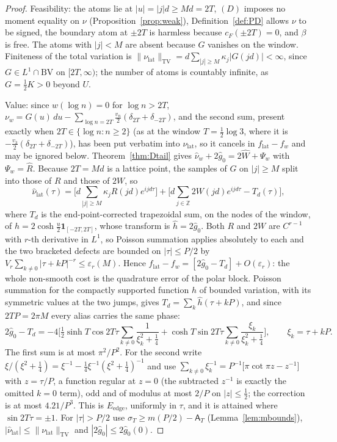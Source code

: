 \documentclass[11pt]{amsart}
\theoremstyle{definition}
\theoremstyle{remark}
\newcommand{\Z}{\mathbb Z}
\newcommand{\TV}{\operatorname{TV}}
\newcommand{\sT}{\sigma_T}
\newcommand{\gh}[1]{\widehat g_{#1}}
\newcommand{\nuh}{\widehat\nu}
\newcommand{\cF}{c_F}
\newcommand{\Aconst}{\mathsf A_T}
\begin{document}
\begin{proof}
Feasibility: the atoms lie at $|u|=|j|d\ge Md=2T$, $(D)$ imposes no moment equality on $\nu$
(Proposition~\ref{prop:weak}), Definition~\ref{def:PD} allows $\nu$ to be signed, the boundary atom
at $\pm2T$ is harmless because $\cF(\pm2T)=0$, and $\beta$ is free. The atoms with $|j|<M$ are absent
because $G$ vanishes on the window. Finiteness of the total variation is
$\|\nu_{\mathrm{lat}}\|_{\TV}=d\sum_{|j|\ge M}\kappa_j|G(jd)|<\infty$, since $G\in L^1\cap
\mathrm{BV}$ on $[2T,\infty)$; the number of atoms is countably infinite, as $G=\frac12K>0$ beyond
$U$.

Value: since $w(\log n)=0$ for $\log n>2T$, $\nu_w=G(u)\,du-\sum_{\log n=2T}\frac{v_n}2(\delta_{2T}+\delta_{-2T})$,
and the second sum, present exactly when $2T\in\{\log n:n\ge2\}$ (as at the window $T=\frac12\log3$,
where it is $-\frac{v_3}2(\delta_{2T}+\delta_{-2T})$), has been put verbatim into
$\nu_{\mathrm{lat}}$, so it cancels in $f_{\mathrm{lat}}-f_w$ and may be ignored below.
Theorem~\ref{thm:Dtail}
gives $\nuh_w+2\gh0=2\widehat W+\Psi_w$ with $\Psi_w=\widehat R$. Because $2T=Md$ is a lattice point,
the samples of $G$ on $|j|\ge M$ split into those of $R$ and those of $2W$, so
\[
\nuh_{\mathrm{lat}}(\tau)=\Big[d\sum_{|j|\ge M}\kappa_jR(jd)e^{ijd\tau}\Big]
+\Big[d\sum_{j\in\Z}2W(jd)e^{ijd\tau}-T_d(\tau)\Big],
\]
where $T_d$ is the end-point-corrected trapezoidal sum, on the nodes of the window, of
$h=2\cosh\frac u2\mathbf 1_{[-2T,2T]}$, whose transform is $\widehat h=2\gh0$. Both $R$ and $2W$ are
$C^{r-1}$ with $r$-th derivative in $L^1$, so Poisson summation applies absolutely to each and the
two bracketed defects are bounded on $|\tau|\le P/2$ by
$V_r\sum_{k\ne0}|\tau+kP|^{-r}\le\varepsilon_r(M)$. Hence
$f_{\mathrm{lat}}-f_w=[2\gh0-T_d]+O(\varepsilon_r)$: the whole non-smooth cost is the quadrature
error of the polar block. Poisson summation for the compactly supported function $h$ of bounded
variation, with its symmetric values at the two jumps, gives $T_d=\sum_k\widehat h(\tau+kP)$, and
since $2TP=2\pi M$ every alias carries the same phase:
\[
2\gh0-T_d=-4\Big[\tfrac12\sinh T\cos2T\tau\sum_{k\ne0}\frac1{\xi_k^2+\frac14}
+\cosh T\sin2T\tau\sum_{k\ne0}\frac{\xi_k}{\xi_k^2+\frac14}\Big],\qquad\xi_k=\tau+kP .
\]
The first sum is at most $\pi^2/P^2$. For the second write
$\xi/(\xi^2+\frac14)=\xi^{-1}-\frac14\xi^{-1}(\xi^2+\frac14)^{-1}$ and use
$\sum_{k\ne0}\xi_k^{-1}=P^{-1}\big[\pi\cot\pi z-z^{-1}\big]$ with $z=\tau/P$, a function
regular at $z=0$ (the subtracted $z^{-1}$ is exactly the omitted $k=0$ term), odd and of
modulus at most $2/P$ on $|z|\le\frac12$; the correction is at most $4.21/P^3$. This is
$E_{\mathrm{edge}}$, uniformly in $\tau$, and it is attained where $\sin2T\tau=\pm1$. For
$|\tau|>P/2$ use $\sT\ge m(P/2)-\Aconst$ (Lemma~\ref{lem:mbounds}),
$|\nuh_{\mathrm{lat}}|\le\|\nu_{\mathrm{lat}}\|_{\TV}$ and $|2\gh0|\le2\gh0(0)$.
\end{proof}
\end{document}
